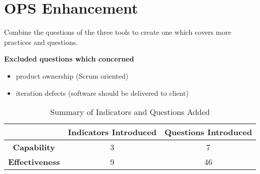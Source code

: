 \section{OPS Enhancement}

Combine the questions of the three tools to create one which covers more practices and questions.

\textbf{Excluded questions which concerned}

\begin{itemize}
	\item product ownership (Scrum oriented)
	\item iteration defects (software should be delivered to client)
\end{itemize}

\begin{table} [H]
	\begin{tabular}{| c | c | c |} \hline
		 & \textbf{Indicators Introduced} & \textbf{Questions Introduced} \\ \hline
		 \textbf{Capability} & 3 & 7 \\ \hline
		 \textbf{Effectiveness} & 9 & 46 \\ \hline
	\end{tabular}
	\caption{Summary of Indicators and Questions Added}
\end{table}

\clearpage